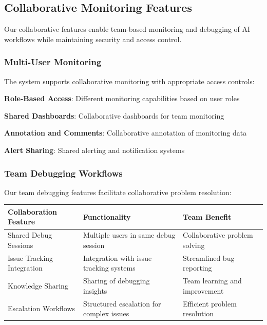 \subsection*{Collaborative Monitoring Features}

Our collaborative features enable team-based monitoring and debugging of AI workflows while maintaining security and access control.

\subsubsection*{Multi-User Monitoring}

The system supports collaborative monitoring with appropriate access controls:

\begin{expandedlist}
    \item \textbf{Role-Based Access}: Different monitoring capabilities based on user roles
    \item \textbf{Shared Dashboards}: Collaborative dashboards for team monitoring
    \item \textbf{Annotation and Comments}: Collaborative annotation of monitoring data
    \item \textbf{Alert Sharing}: Shared alerting and notification systems
\end{expandedlist}

\subsubsection*{Team Debugging Workflows}

Our team debugging features facilitate collaborative problem resolution:

\begin{center}
\begin{tabular}{@{}lll@{}}
\toprule
\textbf{Collaboration Feature} & \textbf{Functionality} & \textbf{Team Benefit} \\
\midrule
Shared Debug Sessions & Multiple users in same debug session & Collaborative problem solving \\
Issue Tracking Integration & Integration with issue tracking systems & Streamlined bug reporting \\
Knowledge Sharing & Sharing of debugging insights & Team learning and improvement \\
Escalation Workflows & Structured escalation for complex issues & Efficient problem resolution \\
\bottomrule
\end{tabular}
\end{center}

